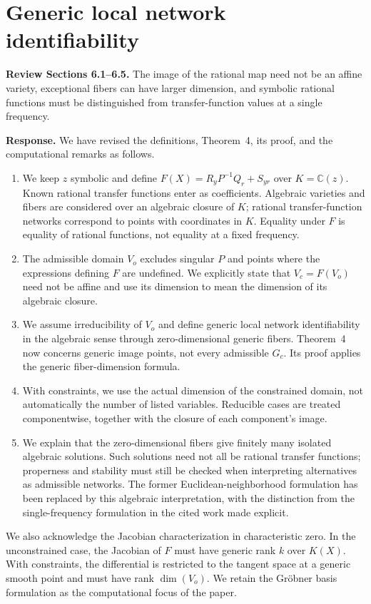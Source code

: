 \documentclass[11pt]{article}
\begin{document}
\section{Generic local network identifiability}
\textbf{Review Sections 6.1--6.5.}
The image of the rational map need not be an affine variety, exceptional fibers
can have larger dimension, and symbolic rational functions must be distinguished
from transfer-function values at a single frequency.

\textbf{Response.}
We have revised the definitions, Theorem~4, its proof, and the computational
remarks as follows.
\begin{enumerate}
\item We keep $z$ symbolic and define
$F(X)=R_yP^{-1}Q_r+S_{yr}$ over $K=\mathbb C(z)$.
Known rational transfer functions enter as coefficients. Algebraic varieties
and fibers are considered over an algebraic closure of $K$; rational
transfer-function networks correspond to points with coordinates in $K$.
Equality under $F$ is equality of rational functions, not equality at a fixed
frequency.
\item The admissible domain $V_o$ excludes singular $P$ and points where the
expressions defining $F$ are undefined. We explicitly state that
$V_c=F(V_o)$ need not be affine and use its dimension to mean the dimension of
its algebraic closure.
\item We assume irreducibility of $V_o$ and define generic local network
identifiability in the algebraic sense through zero-dimensional generic
fibers. Theorem~4 now concerns generic image points, not every admissible
$G_c$. Its proof applies the generic fiber-dimension formula.
\item With constraints, we use the actual dimension of the constrained domain,
not automatically the number of listed variables. Reducible cases are treated
componentwise, together with the closure of each component's image.
\item We explain that the zero-dimensional fibers give finitely many isolated
algebraic solutions. Such solutions need not all be rational transfer functions;
properness and stability must still be checked when interpreting alternatives
as admissible networks. The former Euclidean-neighborhood formulation has been
replaced by this algebraic interpretation, with the distinction from the
single-frequency formulation in the cited work made explicit.
\end{enumerate}

We also acknowledge the Jacobian characterization in characteristic zero.
In the unconstrained case, the Jacobian of $F$ must have generic rank $k$ over
$K(X)$. With constraints, the differential is restricted to the tangent space
at a generic smooth point and must have rank $\dim(V_o)$. We retain the
Gr\"obner basis formulation as the computational focus of the paper.
\end{document}
